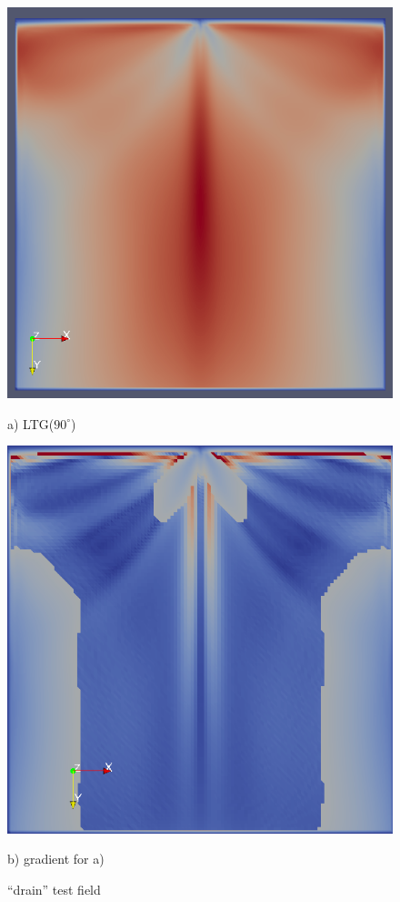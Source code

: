 \documentclass{scrartcl}
\begin{document}
\begin{figure}[!t]
\centering
  \begin{minipage}{0.4\textwidth}
    \includegraphics[width=\textwidth]{img/ftle_drain_alt.png}
    \label{grada)}
    \caption*{a) LTG($90^\circ$) }
  \end{minipage}
  \begin{minipage}{0.4\textwidth}
    \includegraphics[width=\textwidth]{img/drain_alt_gradient.png}
    \label{gradb)}
    \caption*{b) gradient for a)}
  \end{minipage}
  \caption{``drain'' test field}
  \label{grad)}
\end{figure}
\end{document}
